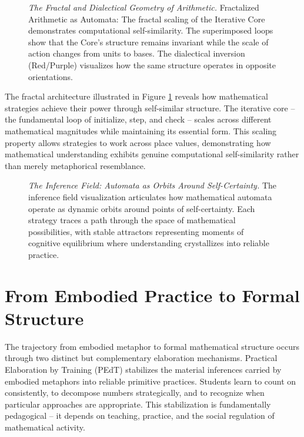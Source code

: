 \documentclass[12pt]{book}
\begin{document}
\begin{figure}[H]
    \centering
    \caption{\textit{The Fractal and Dialectical Geometry of Arithmetic.} Fractalized Arithmetic as Automata: The fractal scaling of the Iterative Core demonstrates computational self-similarity. The superimposed loops show that the Core's structure remains invariant while the scale of action changes from units to bases. The dialectical inversion (Red/Purple) visualizes how the same structure operates in opposite orientations.}
    \label{fig:fractal-automata-arithmetic}
\end{figure}

The fractal architecture illustrated in Figure \ref{fig:fractal-automata-arithmetic} reveals how mathematical strategies achieve their power through self-similar structure. The iterative core -- the fundamental loop of initialize, step, and check -- scales across different mathematical magnitudes while maintaining its essential form. This scaling property allows strategies to work across place values, demonstrating how mathematical understanding exhibits genuine computational self-similarity rather than merely metaphorical resemblance.

\begin{figure}[H]
    \centering
    \caption{\textit{The Inference Field: Automata as Orbits Around Self-Certainty.} The inference field visualization articulates how mathematical automata operate as dynamic orbits around points of self-certainty. Each strategy traces a path through the space of mathematical possibilities, with stable attractors representing moments of cognitive equilibrium where understanding crystallizes into reliable practice.}
    \label{fig:inference-field}
\end{figure}

\section{From Embodied Practice to Formal Structure}

The trajectory from embodied metaphor to formal mathematical structure occurs through two distinct but complementary elaboration mechanisms. Practical Elaboration by Training (PEdT) stabilizes the material inferences carried by embodied metaphors into reliable primitive practices. Students learn to count on consistently, to decompose numbers strategically, and to recognize when particular approaches are appropriate. This stabilization is fundamentally pedagogical -- it depends on teaching, practice, and the social regulation of mathematical activity.
\end{document}
